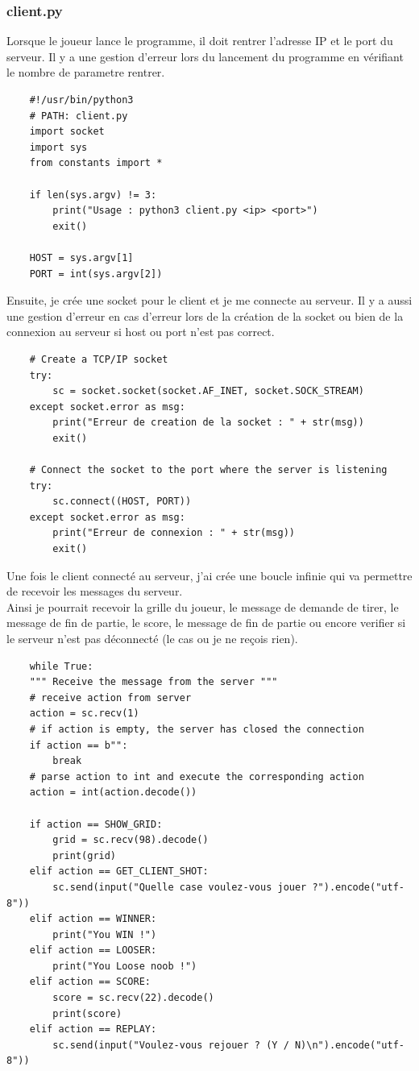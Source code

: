 \documentclass{article}
\begin{document}
\subsubsection{client.py}
Lorsque le joueur lance le programme, il doit rentrer l'adresse IP et le port du serveur. Il y a une gestion d'erreur lors du lancement du programme en vérifiant le nombre de parametre rentrer.\\
\begin{lstlisting}
    #!/usr/bin/python3
    # PATH: client.py
    import socket
    import sys
    from constants import *

    if len(sys.argv) != 3:
        print("Usage : python3 client.py <ip> <port>")
        exit()

    HOST = sys.argv[1]
    PORT = int(sys.argv[2])
\end{lstlisting}
Ensuite, je crée une socket pour le client et je me connecte au serveur. Il y a aussi une gestion d'erreur en cas d'erreur lors de la création de la socket ou bien de la connexion au serveur si host ou port n'est pas correct.\\
\begin{lstlisting}
    # Create a TCP/IP socket
    try:
        sc = socket.socket(socket.AF_INET, socket.SOCK_STREAM)
    except socket.error as msg:
        print("Erreur de creation de la socket : " + str(msg))
        exit()
    
    # Connect the socket to the port where the server is listening
    try:
        sc.connect((HOST, PORT))
    except socket.error as msg:
        print("Erreur de connexion : " + str(msg))
        exit()
\end{lstlisting}
Une fois le client connecté au serveur, j'ai crée une boucle infinie qui va permettre de recevoir les messages du serveur.\\
Ainsi je pourrait recevoir la grille du joueur, le message de demande de tirer, le message de fin de partie, le score, le message de fin de partie ou encore verifier si le serveur n'est pas déconnecté (le cas ou je ne reçois rien).\\
\begin{lstlisting}
    while True:
    """ Receive the message from the server """
    # receive action from server
    action = sc.recv(1)
    # if action is empty, the server has closed the connection
    if action == b"":
        break
    # parse action to int and execute the corresponding action
    action = int(action.decode())

    if action == SHOW_GRID:
        grid = sc.recv(98).decode()
        print(grid)
    elif action == GET_CLIENT_SHOT:
        sc.send(input("Quelle case voulez-vous jouer ?").encode("utf-8"))
    elif action == WINNER:
        print("You WIN !")
    elif action == LOOSER:
        print("You Loose noob !")
    elif action == SCORE:
        score = sc.recv(22).decode()
        print(score)
    elif action == REPLAY:
        sc.send(input("Voulez-vous rejouer ? (Y / N)\n").encode("utf-8"))
\end{lstlisting}
\end{document}
